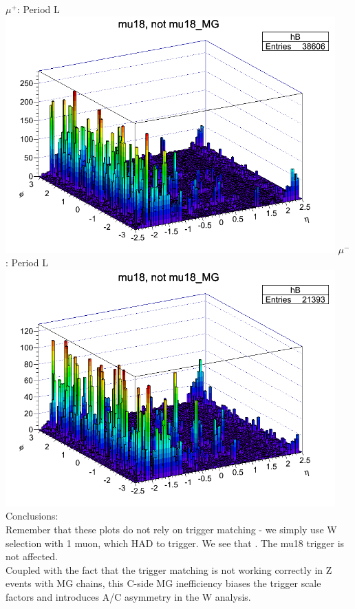 {
\colb[T]
$\mu^+$: Period L
\centering
\includegraphics[width=0.95\textwidth]{dates/20130306/figures/mu18/dump_MG_dataL_w_POS.dat__MUID_NOT_MG.png}
$\mu^-$: Period L
\centering
\includegraphics[width=0.95\textwidth]{dates/20130306/figures/mu18/dump_MG_dataL_w_NEG.dat__MUID_NOT_MG.png}
\cole
}
 {
  Conclusions: \\
  Remember that these plots do not rely on trigger matching - we simply use W selection with 1 muon, which HAD to trigger.
  We see that . The mu18 trigger is not affected. \\
  Coupled with the fact that the trigger matching is not working correctly in Z events with MG chains, this C-side MG inefficiency biases the trigger scale factors and introduces A/C asymmetry in the W analysis.
}

